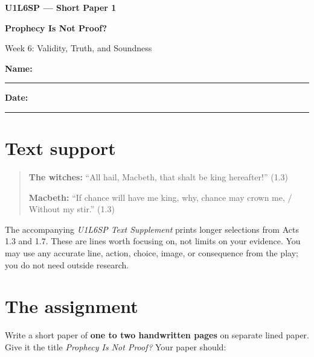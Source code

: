 \documentclass[11pt]{article}
\newcommand{\smallblank}{\rule{0.43\linewidth}{0.4pt}}
\begin{document}
\begin{center}
{\Large\bfseries U1L6SP --- Short Paper 1}\par
{\LARGE\bfseries Prophecy Is Not Proof?}\par
{\large Week 6: Validity, Truth, and Soundness}
\end{center}

\noindent\textbf{Name:} \smallblank\hfill
\textbf{Date:} \rule{1.35in}{0.4pt}

\begingroup\small
\vspace{0.25em}

\section*{Text support}

\begin{quote}
\textbf{The witches:} ``All hail, Macbeth, that shalt be king hereafter!'' (1.3)

\textbf{Macbeth:} ``If chance will have me king, why, chance may crown me, / Without my stir.'' (1.3)
\end{quote}

The accompanying \textit{U1L6SP Text Supplement} prints longer selections from Acts 1.3 and 1.7. These are lines worth focusing on, not limits on your evidence. You may use any accurate line, action, choice, image, or consequence from the play; you do not need outside research.

\section*{The assignment}

Write a short paper of \textbf{one to two handwritten pages} on separate lined paper. Give it the title \textit{Prophecy Is Not Proof?} Your paper should:
\end{document}
